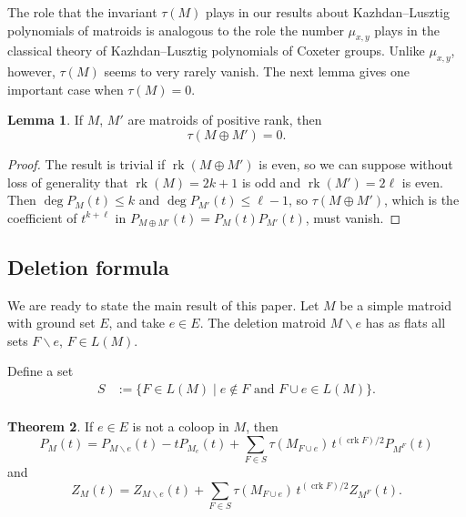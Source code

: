 \documentclass[12pt,reqno]{amsart}
\theoremstyle{definition}
\newtheorem{theorem}{Theorem}[section]
\newtheorem{lemma}[theorem]{Lemma}
\theoremstyle{remark}
\newcommand{\crk}{\operatorname{crk}}
\newcommand{\ssm}{\smallsetminus}
\newcommand{\rk}{\operatorname{rk}}
\renewcommand{\(}{\left(}
\renewcommand{\)}{\right)}
\newcommand{\<}{\left<}
\renewcommand{\>}{\right>}
\begin{document}
The role that the invariant $\tau(M)$ plays in our results about Kazhdan--Lusztig polynomials of matroids is analogous to the role the number $\mu_{x,y}$ plays in the classical theory of Kazhdan--Lusztig polynomials of Coxeter groups. Unlike $\mu_{x,y}$, however, $\tau(M)$ seems to very rarely vanish.  The next lemma gives one important case when $\tau(M) = 0$.


\begin{lemma}\label{lem:vanishing tau}
If $M$, $M'$ are matroids of positive rank, then
\[\tau(M\oplus M') = 0.\]
\end{lemma}
\begin{proof}
The result is trivial if $\rk(M\oplus M')$ is even, so we can suppose without loss of generality
that $\rk(M) = 2k+1$ is odd and $\rk(M') = 2\ell$ is even.  Then $\deg P_M(t) \le k$ and $\deg P_{M'}(t) \le \ell -1$, so $\tau(M\oplus M')$, which is the coefficient of $t^{k+\ell}$ in 
$P_{M\oplus M'}(t) = P_M(t)P_{M'}(t)$, must vanish.
\end{proof}



\subsection{Deletion formula}
We are ready to state the main result of this paper.
Let $M$ be a simple matroid with ground set $E$, and take $e\in E$.  The deletion matroid $M \ssm e$ has as flats all sets $F \ssm e$, $F \in L(M)$.  

Define a set
\begin{align*}
S & := \{F \in L(M)\mid e\notin F \mbox{ and } F\cup e \in L(M)\}. \\
\end{align*}



\begin{theorem}\label{thm:deletion formula}
If $e\in E$ is not a coloop in $M$, then 
\begin{equation}\label{eqn:KL deletion formula}
P_M(t) = P_{M \ssm e}(t) - tP_{M_e}(t) + \sum_{F \in S} \tau(M_{F\cup e})\, t^{(\crk F)/2} P_{M^F}(t)
\end{equation}
and
\begin{equation}\label{eqn:Z deletion formula}
Z_M(t) = Z_{M\ssm e}(t) + \sum_{F \in S} \tau(M_{F\cup e})\, t^{(\crk F)/2}Z_{M^F}(t).
\end{equation}

\end{theorem}
\end{document}
